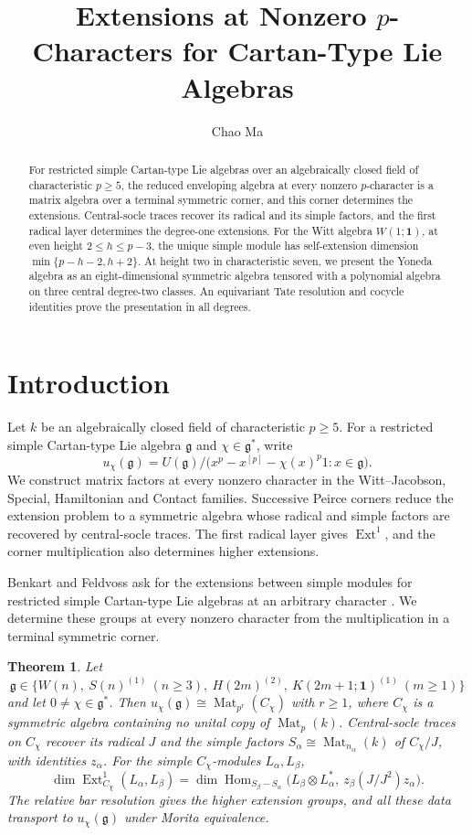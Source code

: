 \documentclass[11pt,reqno]{amsart}
\title[Extensions at nonzero $p$-characters]{Extensions at Nonzero $p$-Characters for Cartan-Type Lie Algebras}
\author{Chao Ma}
\date{}
\newtheorem{theorem}{Theorem}[section]
\theoremstyle{definition}
\theoremstyle{remark}
\theoremstyle{definition}
\newcommand{\Mat}{\operatorname{Mat}}
\newcommand{\Hom}{\operatorname{Hom}}
\newcommand{\Ext}{\operatorname{Ext}}
\begin{document}
\begin{abstract}
For restricted simple Cartan-type Lie algebras over an algebraically
closed field of characteristic
$p\ge5$, the reduced enveloping algebra at every nonzero
$p$-character is a matrix algebra over a terminal symmetric corner,
and this corner determines the extensions.
Central-socle traces recover its radical and its simple factors, and
the first radical layer determines the degree-one extensions.
For the Witt algebra $W(1;\mathbf1)$, at even height $2\le h\le p-3$, the
unique simple module has self-extension dimension
$\min\{p-h-2,h+2\}$.
At height two in characteristic seven, we present the Yoneda algebra
as an eight-dimensional symmetric algebra tensored with a polynomial
algebra on three central degree-two classes. An equivariant Tate
resolution and cocycle identities prove the presentation in all degrees.
\end{abstract}

\maketitle

\section{Introduction}

Let $k$ be an algebraically closed field of characteristic $p\ge5$.
For a restricted simple Cartan-type Lie algebra $\mathfrak g$ and
$\chi\in\mathfrak g^*$, write
\[
 u_\chi(\mathfrak g)=U(\mathfrak g)/
 \bigl(x^p-x^{[p]}-\chi(x)^p1:x\in\mathfrak g\bigr).
\]
We construct matrix factors at every nonzero character in the
Witt--Jacobson, Special, Hamiltonian and Contact families. Successive
Peirce corners reduce the extension problem to a symmetric algebra
whose radical and simple factors are recovered by central-socle traces.
The first radical layer gives $\Ext^1$, and the corner multiplication
also determines higher extensions.

Benkart and Feldvoss ask for the extensions between simple modules for
restricted simple Cartan-type Lie algebras at an arbitrary character
\cite[Problem~4]{BenkartFeldvoss2015}.
We determine these groups at every nonzero character from the
multiplication in a terminal symmetric corner.

\begin{theorem}\label{thm:intro-main}
Let
\[
 \mathfrak g\in\{W(n),\ S(n)^{(1)}\ (n\ge3),\
 H(2m)^{(2)},\ K(2m+1;\mathbf1)^{(1)}\ (m\ge1)\}
\]
and let $0\ne\chi\in\mathfrak g^*$. Then
$u_\chi(\mathfrak g)\cong\Mat_{p^r}(C_\chi)$ with $r\ge1$, where
$C_\chi$ is a symmetric algebra containing no unital copy of
$\Mat_p(k)$. Central-socle traces on $C_\chi$ recover its radical $J$
and the simple factors $S_\alpha\cong\Mat_{n_\alpha}(k)$ of $C_\chi/J$,
with identities $z_\alpha$. For the simple $C_\chi$-modules
$L_\alpha,L_\beta$,
\[
 \dim\Ext^1_{C_\chi}(L_\alpha,L_\beta)
 =\dim\Hom_{S_\beta-S_\alpha}
 \bigl(L_\beta\otimes L_\alpha^*,\ z_\beta(J/J^2)z_\alpha\bigr).
\]
The relative bar resolution gives the higher extension groups, and all
these data transport to $u_\chi(\mathfrak g)$ under Morita equivalence.
\end{theorem}
\end{document}
